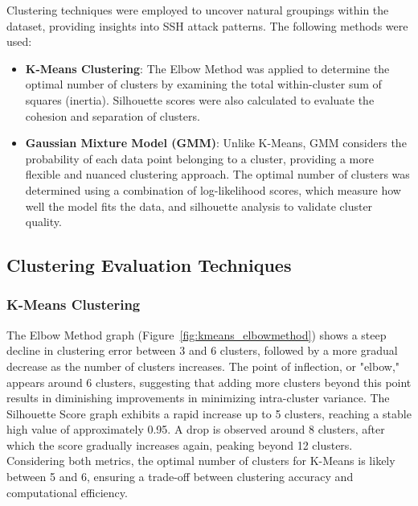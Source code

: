         Clustering techniques were employed to uncover natural groupings within the dataset, providing insights into SSH attack patterns. The following methods were used:
        
        \begin{itemize}
        
            \item \textbf{K-Means Clustering}: The Elbow Method was applied to determine the optimal number of clusters by examining the total within-cluster sum of squares (inertia). Silhouette scores were also calculated to evaluate the cohesion and separation of clusters.
            
            \item \textbf{Gaussian Mixture Model (GMM)}: Unlike K-Means, GMM considers the probability of each data point belonging to a cluster, providing a more flexible and nuanced clustering approach. The optimal number of clusters was determined using a combination of log-likelihood scores, which measure how well the model fits the data, and silhouette analysis to validate cluster quality.
            
        \end{itemize}
        
    \subsection{Clustering Evaluation Techniques}
    
        \subsubsection{K-Means Clustering \\}
            
            The Elbow Method graph (Figure~\ref{fig:kmeans_elbowmethod}) shows a steep decline in clustering error between 3 and 6 clusters, followed by a more gradual decrease as the number of clusters increases. The point of inflection, or "elbow," appears around 6 clusters, suggesting that adding more clusters beyond this point results in diminishing improvements in minimizing intra-cluster variance. The Silhouette Score graph exhibits a rapid increase up to 5 clusters, reaching a stable high value of approximately 0.95. A drop is observed around 8 clusters, after which the score gradually increases again, peaking beyond 12 clusters. Considering both metrics, the optimal number of clusters for K-Means is likely between 5 and 6, ensuring a trade-off between clustering accuracy and computational efficiency.
        
